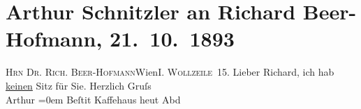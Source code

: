 

         
         \renewcommand{\erwaehntePersonen}{Personen: Richard Beer-Hofmann}
         \renewcommand{\erwaehnteOrte}{Orte: I., Innere Stadt, Wien, Wollzeile}
         \renewcommand{\erwaehnteWerke}{}
               \section[Arthur Schnitzler an Richard Beer-Hofmann, 21. 10. 1893]{ Arthur Schnitzler an Richard Beer-Hofmann, 21. 10. 1893}\nopagebreak{}\rehead{ }\begin{ledgroupsized}[t]{13cm}\normalsize\beginnumbering{} \toendnotes[C]{\smallbreak\pagebreak[2]} 
\pstart{}{\pb}\textsc{Hrn Dr. Rich. Beer-Hofmann}\pend{}\pstart{}Wien\pend{}\pstart{}I. \textsc{Wollzeile 15}.\pend{}{\bigskip}\pstart
           \noindent{}{\pb}Lieber Richard, ich hab \uline{keinen}{ }Sitz für Sie.\pend
           \pstart
           Herzlich Gruſs{\\[\baselineskip]}\spacefill\mbox{Arthur}\pend
           \leftskip=0em{}\pstart
           \noindent{}Beſti{\geminationm}t Kaffehaus heut Abd\pend
           
         
         \endnumbering{}\end{ledgroupsized}  \newcommand{\dateiname}{L00274}\newcommand{\titel}{Arthur Schnitzler an Richard Beer-Hofmann, 21. 10. 1893}\newcommand{\editorInnen}{Martin Anton Müller und Gerd-Hermann Susen}
      